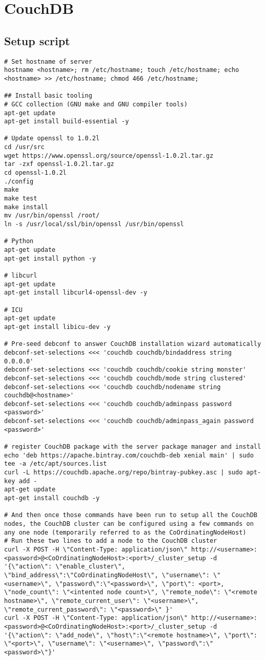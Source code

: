 \section{CouchDB}

\subsection{Setup script}
\label{appendix:couch-setup}
\begin{verbatim}
# Set hostname of server
hostname <hostname>; rm /etc/hostname; touch /etc/hostname; echo <hostname> >> /etc/hostname; chmod 466 /etc/hostname;

## Install basic tooling 
# GCC collection (GNU make and GNU compiler tools)
apt-get update
apt-get install build-essential -y

# Update openssl to 1.0.2l
cd /usr/src
wget https://www.openssl.org/source/openssl-1.0.2l.tar.gz
tar -zxf openssl-1.0.2l.tar.gz
cd openssl-1.0.2l
./config
make
make test
make install
mv /usr/bin/openssl /root/
ln -s /usr/local/ssl/bin/openssl /usr/bin/openssl

# Python
apt-get update
apt-get install python -y

# libcurl
apt-get update
apt-get install libcurl4-openssl-dev -y

# ICU
apt-get update
apt-get install libicu-dev -y

# Pre-seed debconf to answer CouchDB installation wizard automatically
debconf-set-selections <<< 'couchdb couchdb/bindaddress string 0.0.0.0'
debconf-set-selections <<< 'couchdb couchdb/cookie string monster'
debconf-set-selections <<< 'couchdb couchdb/mode string clustered'
debconf-set-selections <<< 'couchdb couchdb/nodename string couchdb@<hostname>'
debconf-set-selections <<< 'couchdb couchdb/adminpass password <password>'
debconf-set-selections <<< 'couchdb couchdb/adminpass_again password <password>'

# register CouchDB package with the server package manager and install
echo 'deb https://apache.bintray.com/couchdb-deb xenial main' | sudo tee -a /etc/apt/sources.list
curl -L https://couchdb.apache.org/repo/bintray-pubkey.asc | sudo apt-key add -
apt-get update
apt-get install couchdb -y

# And then once those commands have been run to setup all the CouchDB nodes, the CouchDB cluster can be configured using a few commands on any one node (temporarily referred to as the CoOrdinatingNodeHost)
# Run these two lines to add a node to the CouchDB cluster
curl -X POST -H \"Content-Type: application/json\" http://<username>:<password>@<CoOrdinatingNodeHost>:<port>/_cluster_setup -d '{\"action\": \"enable_cluster\", \"bind_address\":\"CoOrdinatingNodeHost\", \"username\": \"<username>\", \"password\":\"<password>\", \"port\": <port>, \"node_count\": \"<intented node count>\", \"remote_node\": \"<remote hostname>\", \"remote_current_user\": \"<username>\", \"remote_current_password\": \"<password>\" }'
curl -X POST -H \"Content-Type: application/json\" http://<username>:<password>@<CoOrdinatingNodeHost>:<port>/_cluster_setup -d '{\"action\": \"add_node\", \"host\":\"<remote hostname>\", \"port\": \"<port>\", \"username\": \"<username>\", \"password\":\"<password>\"}'


\end{verbatim}
